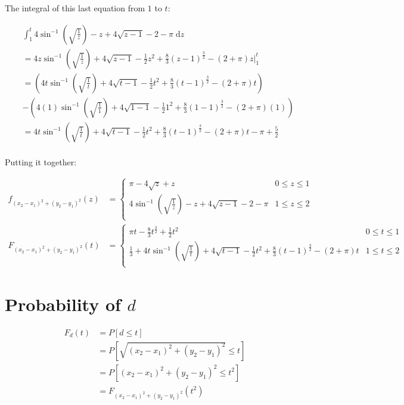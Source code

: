 \documentclass{article}
\newcommand{\dz}{{\; \mathrm{d}z}}
\begin{document}
The integral of this last equation from $1$ to $t$:

\begin{align*}
&  \int_{1}^{t} 4 \sin^{-1} \left( \sqrt{\frac{1}{z}} \right) - z + 4\sqrt{z - 1} - 2 - \pi \dz \\
&= 4z \sin^{-1} \left( \sqrt{\frac{1}{z}} \right) + 4\sqrt{z-1} - \frac{1}{2} z^2 + \frac{8}{3}(z - 1)^\frac{3}{2} - (2 + \pi)z \Big|_{1}^{t} \\
&= \left( 4t \sin^{-1} \left( \sqrt{\frac{1}{t}} \right) + 4\sqrt{t-1} - \frac{1}{2} t^2 + \frac{8}{3}(t - 1)^\frac{3}{2} - (2 + \pi)t \right) \\
&  - \left( 4(1) \sin^{-1} \left( \sqrt{\frac{1}{1}} \right) + 4\sqrt{1-1} - \frac{1}{2} 1^2 + \frac{8}{3}(1 - 1)^\frac{3}{2} - (2 + \pi)(1) \right) \\
&= 4t \sin^{-1} \left( \sqrt{\frac{1}{t}} \right) + 4\sqrt{t-1} - \frac{1}{2} t^2 + \frac{8}{3}(t - 1)^\frac{3}{2} - (2 + \pi) t - \pi + \frac{5}{2} \\
\end{align*}

Putting it together:

\begin{align*}
f_{(x_2 - x_1)^2 + (y_2 - y_1)^2}(z) &=
\begin{cases}
    \pi - 4\sqrt{z} + z                                                         & 0 \leq z \leq 1 \\
    4 \sin^{-1} \left( \sqrt{\frac{1}{z}} \right) - z + 4\sqrt{z - 1} - 2 - \pi & 1 \leq z \leq 2 \\
\end{cases}
\\
F_{(x_2 - x_1)^2 + (y_2 - y_1)^2}(t) &=
\begin{cases}
    \pi t - \frac{8}{3} t^{\frac{3}{2}} + \frac{1}{2}t^2
        & 0 \leq t \leq 1 \\
    \frac{1}{3} + 4t \sin^{-1} \left( \sqrt{\frac{1}{t}} \right) + 4\sqrt{t-1} - \frac{1}{2} t^2 + \frac{8}{3}(t - 1)^\frac{3}{2} - (2 + \pi) t
        & 1 \leq t \leq 2 \\
\end{cases}
\end{align*}

\section{Probability of $d$}

\begin{align*}
F_d(t)
&= P[d \leq t] \\
&= P[\sqrt{(x_2 - x_1)^2 + (y_2 - y_1)^2} \leq t] \\
&= P[(x_2 - x_1)^2 + (y_2 - y_1)^2 \leq t^2] \\
&= F_{(x_2 - x_1)^2 + (y_2 - y_1)^2}(t^2) \\
\end{align*}
\end{document}
